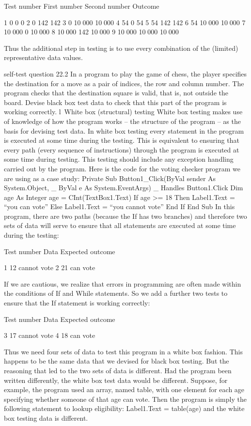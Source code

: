 Test number	First number	Second number	Outcome

1	0	0	0
2	0	142	142
3	0	10 000	10 000
4	54	0	54
5	54	142	142
6	54	10 000	10 000
7	10 000	0	10 000
8	10 000	142	10 000
9	10 000	10 000	10 000

Thus the additional step in testing is to use every combination of the (limited) representative data values.

self-test question
22.2	In a program to play the game of chess, the player speciﬁes the destination for a move as a pair of indices, the row and column number. The program checks that the destination square is valid, that is, not outside the board. Devise black box test data to check that this part of the program is working correctly.
l White box (structural) testing
White box testing makes use of knowledge of how the program works – the structure of the program – as the basis for devising test data. In white box testing every statement in the program is executed at some time during the testing. This is equivalent to ensuring that every path (every sequence of instructions) through the program is executed at some time during testing. This testing should include any exception handling carried out by the program.
Here is the code for the voting checker program we are using as a case study:
Private Sub Button1_Click(ByVal sender As System.Object, _
			ByVal e As System.EventArgs) _
			Handles Button1.Click
	Dim age As Integer
	age = CInt(TextBox1.Text)
	If age >= 18 Then
		Label1.Text = “you can vote”
	Else
		Label1.Text = “you cannot vote”
	End If
End Sub
In this program, there are two paths (because the If has two branches) and therefore two sets of data will serve to ensure that all statements are executed at some time during the testing:

Test number	Data	Expected outcome

1	12	cannot vote
2	21	can vote

If we are cautious, we realize that errors in programming are often made within the conditions of If and While statements. So we add a further two tests to ensure that the If statement is working correctly:

Test number	Data	Expected outcome

3	17	cannot vote
4	18	can vote
 
Thus we need four sets of data to test this program in a white box fashion. This 
happens to be the same data that we devised for black box testing. But the reasoning that led to the two sets of data is different. Had the program been written differently, the white box test data would be different. Suppose, for example, the program used 
an array, named table, with one element for each age specifying whether someone 
of that age can vote. Then the program is simply the following statement to lookup 
eligibility:
Label1.Text = table(age)
and the white box testing data is different.


